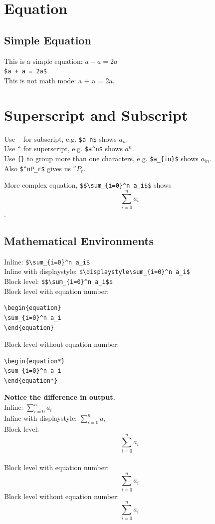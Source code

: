 \documentclass{article}
\begin{document}
\section{Equation}

\subsection{Simple Equation}

This is a simple equation: $a + a = 2a$\\
\verb|$a + a = 2a$|\\
This is not math mode: a + a = 2a.

\section{Superscript and Subscript}

Use \verb|_| for subscript, e.g. \verb|$a_n$| shows $a_n$.\\
Use \verb|^| for superscript, e.g. \verb|$a^n$| shows $a^n$.\\
Use \verb|{}| to group more than one characters, e.g. \verb|$a_{in}$| shows $a_{in}$.\\
Also \verb|$^nP_r$| gives us $^nP_r$.

More complex equation, \verb|$$\sum_{i=0}^n a_i$$| shows $$\sum_{i=0}^n a_i$$.

\subsection{Mathematical Environments}

Inline: \verb|$\sum_{i=0}^n a_i$|\\
Inline with displaystyle: \verb|$\displaystyle\sum_{i=0}^n a_i$|\\
Block level: \verb|$$\sum_{i=0}^n a_i$$|\\
Block level with equation number:
\begin{verbatim}
\begin{equation}
\sum_{i=0}^n a_i
\end{equation}
\end{verbatim}
Block level without equation number:
\begin{verbatim}
\begin{equation*}
\sum_{i=0}^n a_i
\end{equation*}
\end{verbatim}

\textbf{Notice the difference in output.}\\
Inline: $\sum_{i=0}^n a_i$\\
Inline with displaystyle: $\displaystyle\sum_{i=0}^n a_i$\\
Block level: $$\sum_{i=0}^n a_i$$\\
Block level with equation number:
\begin{equation}
\sum_{i=0}^n a_i
\end{equation}
Block level without equation number:
\begin{equation*}
\sum_{i=0}^n a_i
\end{equation*}
\end{document}
